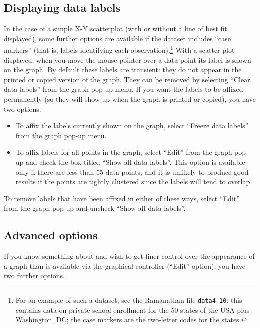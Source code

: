 \subsection{Displaying data labels}
\label{plot-labels}

In the case of a simple X-Y scatterplot (with or without a line of
best fit displayed), some further options are available if the dataset
includes ``case markers'' (that is, labels identifying each
observation).\footnote{For an example of such a dataset, see the
  Ramanathan file \verb+data4-10+: this contains data on private
  school enrollment for the 50 states of the USA plus Washington, DC;
  the case markers are the two-letter codes for the states.} With a
scatter plot displayed, when you move the mouse pointer over a data
point its label is shown on the graph.  By default these labels are
transient: they do not appear in the printed or copied version of the
graph.  They can be removed by selecting ``Clear data labels'' from
the graph pop-up menu. If you want the labels to be affixed
permanently (so they will show up when the graph is printed or
copied), you have two options.
    
\begin{itemize}
\item To affix the labels currently shown on the graph, select
  ``Freeze data labels'' from the graph pop-up menu.
\item To affix labels for all points in the graph, select ``Edit''
  from the graph pop-up and check the box titled ``Show all data
  labels''.  This option is available only if there are less than 55
  data points, and it is unlikely to produce good results if the
  points are tightly clustered since the labels will tend to overlap.
\end{itemize}

To remove labels that have been affixed in either of these ways,
select ``Edit'' from the graph pop-up and uncheck ``Show all data
labels''.
    

\subsection{Advanced options}
\label{plot-advanced}

If you know something about  and wish to get finer
control over the appearance of a graph than is available via the
graphical controller (``Edit'' option), you have two further options.


